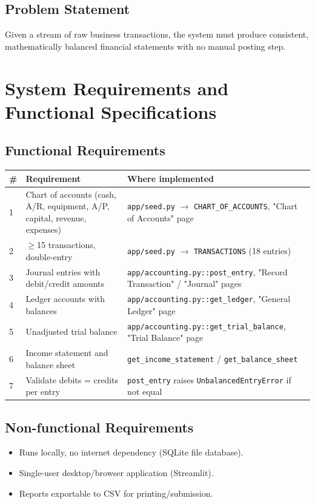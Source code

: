 \documentclass[11pt]{article}
\begin{document}
\subsection*{Problem Statement}
Given a stream of raw business transactions, the system must produce
consistent, mathematically balanced financial statements with no
manual posting step.

\section{System Requirements and Functional Specifications}

\subsection*{Functional Requirements}

\begin{longtable}{p{0.5cm} p{6.5cm} p{6.5cm}}
\toprule
\textbf{\#} & \textbf{Requirement} & \textbf{Where implemented} \\
\midrule
\endhead
1 & Chart of accounts (cash, A/R, equipment, A/P, capital, revenue, expenses) & \texttt{app/seed.py} $\rightarrow$ \texttt{CHART\_OF\_ACCOUNTS}, "Chart of Accounts" page \\
2 & $\geq$15 transactions, double-entry & \texttt{app/seed.py} $\rightarrow$ \texttt{TRANSACTIONS} (18 entries) \\
3 & Journal entries with debit/credit amounts & \texttt{app/accounting.py::post\_entry}, "Record Transaction" / "Journal" pages \\
4 & Ledger accounts with balances & \texttt{app/accounting.py::get\_ledger}, "General Ledger" page \\
5 & Unadjusted trial balance & \texttt{app/accounting.py::get\_trial\_balance}, "Trial Balance" page \\
6 & Income statement and balance sheet & \texttt{get\_income\_statement} / \texttt{get\_balance\_sheet} \\
7 & Validate debits = credits per entry & \texttt{post\_entry} raises \texttt{UnbalancedEntryError} if not equal \\
\bottomrule
\end{longtable}

\subsection*{Non-functional Requirements}
\begin{itemize}
    \item Runs locally, no internet dependency (SQLite file database).
    \item Single-user desktop/browser application (Streamlit).
    \item Reports exportable to CSV for printing/submission.
\end{itemize}
\end{document}
